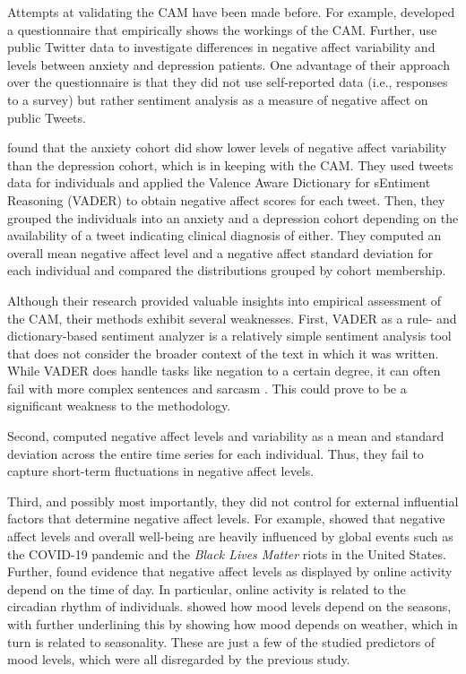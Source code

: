 Attempts at validating the CAM have been made before. For example, \citet{cam_questionnaire} developed a questionnaire that empirically shows the workings of the CAM. Further, \citet{rutter2024} use public Twitter data to investigate differences in negative affect variability and levels between anxiety and depression patients. One advantage of their approach over the questionnaire is that they did not use self-reported data (i.e., responses to a survey) but rather sentiment analysis as a measure of negative affect on public Tweets. 

\citeauthor{rutter2024} found that the anxiety cohort did show lower levels of negative affect variability than the depression cohort, which is in keeping with the CAM. They used tweets data for individuals and applied the Valence Aware Dictionary for sEntiment Reasoning (VADER) \citep{vader} to obtain negative affect scores for each tweet. Then, they grouped the individuals into an anxiety and a depression cohort depending on the availability of a tweet indicating clinical diagnosis of either. They computed an overall mean negative affect level and a negative affect standard deviation for each individual and compared the distributions grouped by cohort membership.

Although their research provided valuable insights into empirical assessment of the CAM, their methods exhibit several weaknesses. First, VADER as a rule- and dictionary-based sentiment analyzer is a relatively simple sentiment analysis tool that does not consider the broader context of the text in which it was written. While VADER does handle tasks like negation to a certain degree, it can often fail with more complex sentences and sarcasm \citep{understandingVADER}. This could prove to be a significant weakness to the methodology.

Second, \citeauthor{rutter2024} computed negative affect levels and variability as a mean and standard deviation across the entire time series for each individual. Thus, they fail to capture short-term fluctuations in negative affect levels.

Third, and possibly most importantly, they did not control for external influential factors that determine negative affect levels. For example, \citet{bathina2021Covid} showed that negative affect levels and overall well-being are heavily influenced by global events such as the COVID-19 pandemic and the \textit{Black Lives Matter} riots in the United States. Further, \citet{tenthij2020circadian} found evidence that negative affect levels as displayed by online activity depend on the time of day. In particular, online activity is related to the circadian rhythm of individuals. \citet{dzogang2017seasonal} showed how mood levels depend on the seasons, with \citet{denissen2008weather} further underlining this by showing how mood depends on weather, which in turn is related to seasonality. These are just a few of the studied predictors of mood levels, which were all disregarded by the previous study. 

